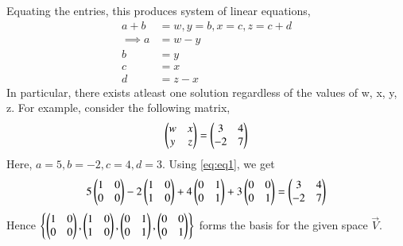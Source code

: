 \documentclass[journal,12pt,twocolumn]{IEEEtran}
\begin{document}
Equating the entries, this produces system of linear equations,
\begin{align}
	a + b &= w, y = b, x = c, z = c + d\\
	\implies a &= w - y\\
	 b &= y\\
	  c &= x\\
	  d &= z - x
\end{align}
In particular, there exists atleast one solution regardless of the values of w, x, y, z.
For example, consider the following matrix,
\begin{align}
	\begin{pmatrix}w & x\\ y & z\end{pmatrix} = \begin{pmatrix}3 & 4 \\ -2 & 7\end{pmatrix}
\end{align}
Here, $a = 5, b = -2, c = 4, d = 3$. Using \eqref{eq:eq1}, we get
\begin{align}
	5\begin{pmatrix}1& 0\\0 & 0\end{pmatrix} - 2\begin{pmatrix}1 & 0\\1 & 0\end{pmatrix} + 4\begin{pmatrix}0& 1\\0 & 1\end{pmatrix} + 3\begin{pmatrix}0 & 0\\0 & 1\end{pmatrix} = \begin{pmatrix}3 & 4 \\ -2 & 7\end{pmatrix}
\end{align}
Hence $\left\{\begin{pmatrix}1 & 0\\0 & 0\end{pmatrix}, \begin{pmatrix}1 & 0\\1 & 0\end{pmatrix}, \begin{pmatrix}0& 1\\0 & 1\end{pmatrix}, \begin{pmatrix}0 & 0\\0 & 1\end{pmatrix}\right\}$ forms the basis for the given space $\vec{V}$.
\end{document}
